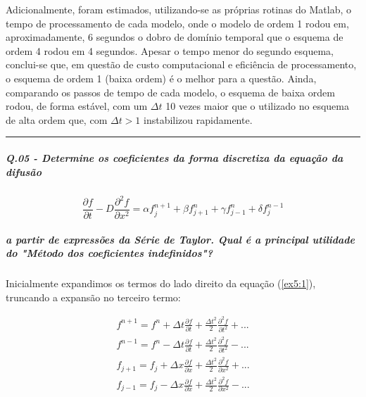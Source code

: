 \documentclass[11pt]{article}
\begin{document}
Adicionalmente, foram estimados, utilizando-se as próprias rotinas do
Matlab, o tempo de processamento de cada modelo, onde o modelo de ordem
1 rodou em, aproximadamente, 6 segundos o dobro de domínio temporal que
o esquema de ordem 4 rodou em 4 segundos. Apesar o tempo menor do
segundo esquema, conclui-se que, em questão de custo computacional e
eficiência de processamento, o esquema de ordem 1 (baixa ordem) é o
melhor para a questão. Ainda, comparando os passos de tempo de cada
modelo, o esquema de baixa ordem rodou, de forma estável, com um
\(\Delta{t}\) 10 vezes maior que o utilizado no esquema de alta ordem
que, com \(\Delta{t} > 1\) instabilizou rapidamente.

    \begin{center}\rule{0.5\linewidth}{\linethickness}\end{center}

    \subparagraph{Q.05 - Determine os coeficientes da forma discretiza da
equação da
difusão}\label{q.05---determine-os-coeficientes-da-forma-discretiza-da-equauxe7uxe3o-da-difusuxe3o}

\begin{equation}
    \frac{\partial{f}}{\partial{t}} - D\frac{\partial^2{f}}{\partial{x^2}} = \alpha f^{n+1}_{j} + \beta f^{n}_{j+1} + \gamma f^{n}_{j-1} + \delta f^{n-1}_{j}
    \label{ex5:1}
\end{equation}

\subparagraph{a partir de expressões da Série de Taylor. Qual é a
principal utilidade do "Método dos coeficientes
indefinidos"?}\label{a-partir-de-expressuxf5es-da-suxe9rie-de-taylor.-qual-uxe9-a-principal-utilidade-do-muxe9todo-dos-coeficientes-indefinidos}

Inicialmente expandimos os termos do lado direito da equação
(\ref{ex5:1}), truncando a expansão no terceiro termo:

\begin{equation}
\begin{aligned}
    f^{n+1} = f^{n} + \Delta{t}\frac{\partial{f}}{\partial{t}} + \frac{\Delta{t}^2}{2}\frac{\partial^2{f}}{\partial{t^2}} + ...
    \\
    f^{n-1} = f^{n} - \Delta{t}\frac{\partial{f}}{\partial{t}} + \frac{\Delta{t}^2}{2}\frac{\partial^2{f}}{\partial{t^2}} - ...
    \\
    f_{j+1} = f_{j} + \Delta{x}\frac{\partial{f}}{\partial{x}} + \frac{\Delta{t}^2}{2}\frac{\partial^2{f}}{\partial{x^2}} + ...
    \\
    f_{j-1} = f_{j} - \Delta{x}\frac{\partial{f}}{\partial{x}} + \frac{\Delta{t}^2}{2}\frac{\partial^2{f}}{\partial{x^2}} - ...
\end{aligned}
    \label{ex5:2}
\end{equation}
\end{document}
